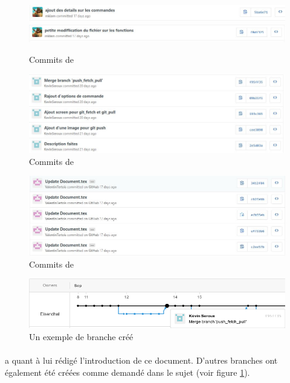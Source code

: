 \documentclass[11pt,canadien]{article}
\begin{document}
\begin{figure}[h]
	\centering
	\includegraphics[width=\textwidth]{images/commit_karen.JPG}
	\includegraphics[width=\textwidth]{images/commit_karen2.JPG}
	\caption{Commits de \karen}
\end{figure}

\begin{figure}[h]
	\centering
	\includegraphics[width=\textwidth]{images/commit_kevin.JPG}
	\caption{Commits de \kevin}
\end{figure}

\begin{figure}[h]
	\centering
	\includegraphics[width=\textwidth]{images/commit_valentin.JPG}
	\caption{Commits de \valentin}
\end{figure}


\begin{figure}[h]
	\centering
	\includegraphics[width=\textwidth]{images/merge_branche.png}
	\caption{Un exemple de branche créé}
	\label{fig:Branche}
\end{figure}

\paragraph{}\antoine a quant à lui rédigé l'introduction de ce document. D'autres branches ont également été créées comme demandé dans le sujet (voir figure \ref{fig:Branche}).
\end{document}
